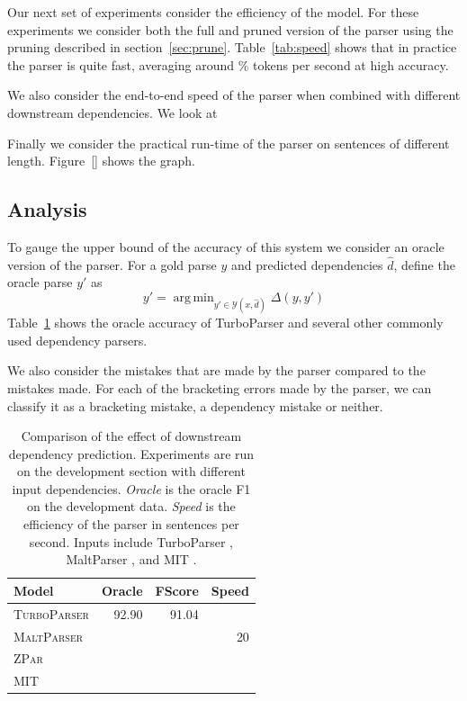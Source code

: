 \documentclass[11pt,letterpaper]{article}
\DeclareMathOperator*{\argmin}{arg\,min}
\begin{document}
Our next set of experiments consider the efficiency of the model. For these experiments we consider both the full and pruned version of the parser using the pruning described in section~\ref{sec:prune}. Table~\ref{tab:speed} shows that in practice the parser is quite fast,  averaging around \% tokens per second at high accuracy.

We also consider the end-to-end speed of the parser when combined with different downstream dependencies. We look at

Finally we consider the practical run-time of the parser on sentences of different length. Figure~\ref{} shows the graph.


\subsection{Analysis}
\label{sec:analysis}

To gauge the upper bound of the accuracy of this system we consider an oracle version of the parser. For a gold parse $y$ and predicted dependencies $\hat{d}$,  define the oracle parse $y'$ as
\[ y' = \argmin_{y' \in \mathcal{Y}(x, \hat{d})} \Delta(y, y') \]
\noindent Table~\ref{tab:oracle} shows the oracle accuracy of TurboParser and several other commonly used dependency parsers.

We also consider the mistakes that are made by the parser compared to the
mistakes made. For each of the bracketing errors made by the parser, we can classify it as a bracketing mistake, a dependency mistake or neither.


\begin{table}
  \centering
  \small

  \begin{tabular}{|l|rrr|}
    \hline
    Model & Oracle & FScore & Speed  \\
    \hline

    \hline
    \textsc{TurboParser} & 92.90 & 91.04 & \\
    \textsc{MaltParser}  & & & 20 \\
    \textsc{ZPar}        & & & \\
    \textsc{MIT}         & & & \\
    \hline
  \end{tabular}

  \vspace{0.5cm}

  \label{tab:oracle}
  \caption{Comparison of the effect of downstream dependency prediction.
    Experiments are run on the development section with different input dependencies. \textit{Oracle} is the oracle F1 on the development data. \textit{Speed} is the efficiency of the parser in sentences per second.
    Inputs include TurboParser \cite{martins2013turning}, MaltParser \cite{nivre2006maltparser}, and MIT \cite{}. }
\end{table}
\end{document}
